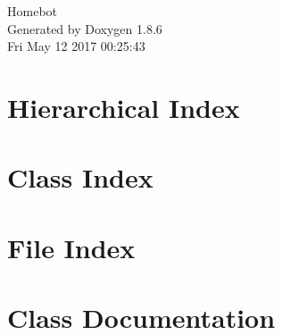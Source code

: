 \documentclass[twoside]{book}
\newcommand{\clearemptydoublepage}{%
  \newpage{\pagestyle{empty}\cleardoublepage}%
}
\begin{document}
\hypersetup{pageanchor=false}
\begin{titlepage}
\vspace*{7cm}
\begin{center}%
{\Large Homebot }\\
\vspace*{1cm}
{\large Generated by Doxygen 1.8.6}\\
\vspace*{0.5cm}
{\small Fri May 12 2017 00:25:43}\\
\end{center}
\end{titlepage}
\clearemptydoublepage
\tableofcontents
\clearemptydoublepage
{}
\hypersetup{pageanchor=true}

\chapter{Hierarchical Index}

\chapter{Class Index}

\chapter{File Index}

\chapter{Class Documentation}

















\end{document}
